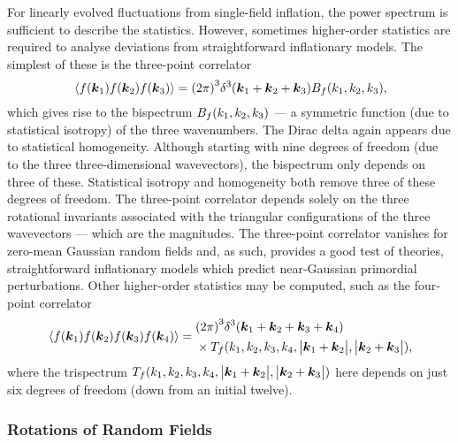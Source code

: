 For linearly evolved fluctuations from single-field inflation, the power spectrum is sufficient to describe the statistics.
However, sometimes higher-order statistics are required to analyse deviations from straightforward inflationary models.
The simplest of these is the three-point correlator
%
\begin{equation}
    \expval*{f(\vb*{k}_{1}) f(\vb*{k}_{2}) f(\vb*{k}_{3})}
    = {(2\pi)}^{3} \delta^{3}(\vb*{k}_{1} + \vb*{k}_{2} + \vb*{k}_{3}) B_{f}(k_{1},k_{2},k_{3}),
\end{equation}
%
which gives rise to the bispectrum \(B_{f}(k_{1},k_{2},k_{3})\) --- a symmetric function (due to statistical isotropy) of the three wavenumbers.
The Dirac delta again appears due to statistical homogeneity.
Although starting with nine degrees of freedom (due to the three three-dimensional wavevectors), the bispectrum only depends on three of these.
Statistical isotropy and homogeneity both remove three of these degrees of freedom.
The three-point correlator depends solely on the three rotational invariants associated with the triangular configurations of the three wavevectors --- which are the magnitudes.
The three-point correlator vanishes for zero-mean Gaussian random fields and, as such, provides a good test of theories, \ie{} straightforward inflationary models which predict near-Gaussian primordial perturbations.
Other higher-order statistics may be computed, such as the four-point correlator
%
\begin{align}
    \expval*{f(\vb*{k}_{1}) f(\vb*{k}_{2}) f(\vb*{k}_{3}) f(\vb*{k}_{4})} =
    \begin{aligned}
         & {(2\pi)}^{3} \delta^{3}(\vb*{k}_{1} + \vb*{k}_{2} + \vb*{k}_{3} + \vb*{k}_{4}) \\
         & \times T_{f}(k_{1},k_{2},k_{3},k_{4},\big\lvert\vb*{k}_{1}+\vb*{k}_{2}\big\rvert,\big\lvert\vb*{k}_{2}+\vb*{k}_{3}\big\rvert),
    \end{aligned}
\end{align}
%
where the trispectrum \(T_{f}(k_{1},k_{2},k_{3},k_{4},\big\lvert\vb*{k}_{1}+\vb*{k}_{2}\big\rvert,\big\lvert\vb*{k}_{2}+\vb*{k}_{3}\big\rvert)\) here depends on just six degrees of freedom (down from an initial twelve).

\subsubsection{Rotations of Random Fields}

